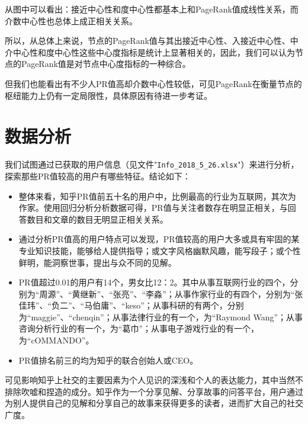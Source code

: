 \documentclass[a4paper]{article}
\begin{document}
\begin{spacing}{1.5}
从图中可以看出：接近中心性和度中心性都基本上和PageRank值成线性关系，而介数中心性也总体上成正相关关系。

所以，从总体上来说，节点的PageRank值与其出接近中心性、入接近中心性、中介中心性和度中心性这些中心度指标是统计上显著相关的，因此，我们可以认为节点的PageRank值是对节点中心度指标的一种综合。

但我们也能看出有不少人PR值高却介数中心性较低，可见PageRank在衡量节点的枢纽能力上仍有一定局限性，具体原因有待进一步考证。

\newpage
\section{数据分析}\label{sec7}
我们试图通过已获取的用户信息（见文件"\verb"Info_2018_5_26.xlsx""）来进行分析，探索那些PR值较高的用户有哪些特征。结论如下：

\begin{itemize}
\item
整体来看，知乎PR值前五十名的用户中，比例最高的行业为互联网，其次为作家。使用回归分析分析数据可得，PR值与关注者数存在明显正相关，与回答数目和文章的数目无明显正相关关系。

\item
通过分析PR值高的用户特点可以发现，PR值较高的用户大多或具有牢固的某专业知识技能，能够给人提供指导；或文字风格幽默风趣，能写段子；或个性鲜明，能洞察世事，提出与众不同的见解。

\item
PR值超过0.01的用户有14个，男女比12：2。其中从事互联网行业的四个，分别为“周源”、“黄继新”、“张亮”、“李淼”；从事作家行业的有四个，分别为“张佳玮”、“负二”、“马伯庸”、“keso”；从事科研的有两个，分别为“maggie”、“chenqin”；从事法律行业的有一个，为“Raymond Wang”；从事咨询分析行业的有一个，为“葛巾”；从事电子游戏行业的有一个，为“cOMMANDO”。

\item
PR值排名前三的均为知乎的联合创始人或CEO。


\end{itemize}

可见影响知乎上社交的主要因素为个人见识的深浅和个人的表达能力，其中当然不排除吹嘘和捏造的成分。知乎作为一个分享见解、分享故事的问答平台，用户通过为别人提供自己的见解和分享自己的故事来获得更多的读者，进而扩大自己的社交广度。
\end{spacing}
\end{document}
